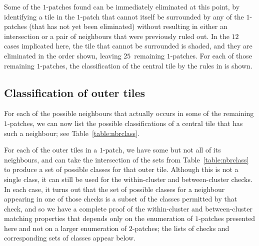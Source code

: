 Some of the $1$-patches found can be immediately eliminated at this
point, by identifying a tile in the $1$-patch that cannot itself be
surrounded by any of the $1$-patches (that has not yet been
eliminated) without resulting in either an intersection or a pair of
neighbours that were previously ruled out.  In the $12$ cases 
implicated here, the tile that cannot be surrounded is shaded, and they are
eliminated in the order shown, leaving $25$~remaining $1$-patches.
For each of those remaining $1$-patches, the classification of the
central tile by the
rules in  is shown.



\FloatBarrier

\subsection{Classification of outer tiles}

For each of the possible neighbours that actually occurs in some of
the remaining $1$-patches, we can now list the possible
classifications of a central tile that has such a neighbour; see
Table~\ref{table:nbrclass}.

For each of the outer tiles in a $1$-patch, we have some but not all
of its neighbours, and can take the intersection of the sets from
Table~\ref{table:nbrclass} to produce a set of possible classes for
that outer tile.  Although this is not a single class, it can still be
used for the within-cluster and between-cluster checks.  In each case,
it turns out that the set of possible classes for a neighbour
appearing in one of those checks is a subset of the classes permitted
by that check, and so we have a complete proof of the within-cluster
and between-cluster matching properties that depends only on the
enumeration of $1$-patches presented here and not on a larger
enumeration of $2$-patches; the lists of checks and corresponding sets
of classes appear below.



\FloatBarrier
